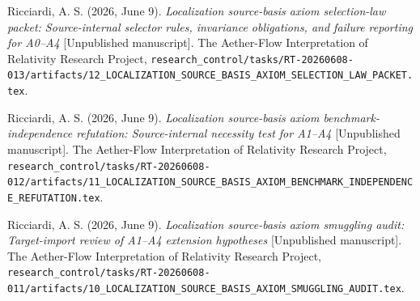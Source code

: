 \documentclass[11pt]{article}
\begin{document}
Ricciardi, A. S. (2026, June 9). \emph{Localization source-basis axiom
selection-law packet: Source-internal selector rules, invariance obligations,
and failure reporting for A0--A4} [Unpublished manuscript]. The Aether-Flow
Interpretation of Relativity Research Project,
\texttt{research\_control/tasks/RT-20260608-013/artifacts/12\_LOCALIZATION\_SOURCE\_BASIS\_AXIOM\_SELECTION\_LAW\_PACKET.tex}.

Ricciardi, A. S. (2026, June 9). \emph{Localization source-basis axiom
benchmark-independence refutation: Source-internal necessity test for A1--A4}
[Unpublished manuscript]. The Aether-Flow Interpretation of Relativity
Research Project,
\texttt{research\_control/tasks/RT-20260608-012/artifacts/11\_LOCALIZATION\_SOURCE\_BASIS\_AXIOM\_BENCHMARK\_INDEPENDENCE\_REFUTATION.tex}.

Ricciardi, A. S. (2026, June 9). \emph{Localization source-basis axiom
smuggling audit: Target-import review of A1--A4 extension hypotheses}
[Unpublished manuscript]. The Aether-Flow Interpretation of Relativity
Research Project,
\texttt{research\_control/tasks/RT-20260608-011/artifacts/10\_LOCALIZATION\_SOURCE\_BASIS\_AXIOM\_SMUGGLING\_AUDIT.tex}.
\end{document}
